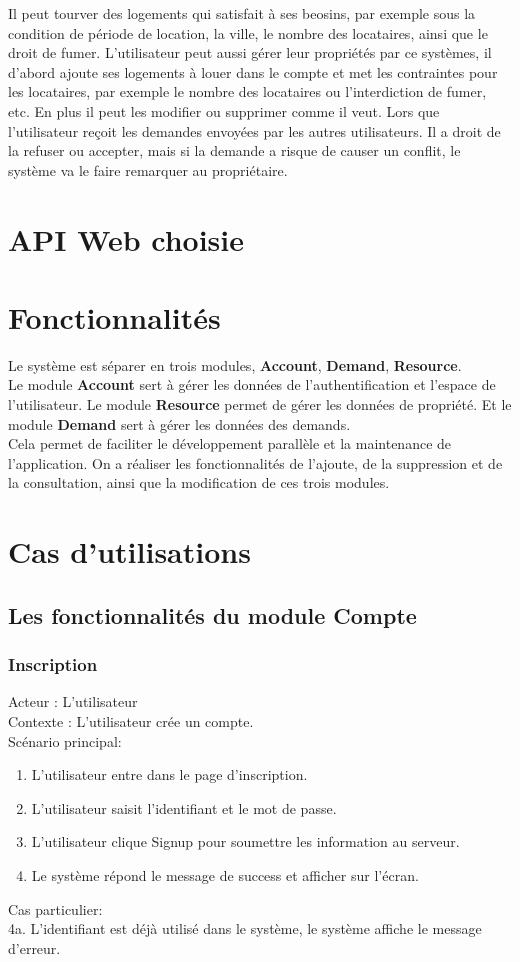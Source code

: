 \documentclass[14px]{article}
\begin{document}
Il peut tourver des logements qui satisfait à ses beosins, par exemple sous la condition de période de location, la ville, le nombre des locataires, ainsi que le droit de fumer.
L'utilisateur peut aussi gérer leur propriétés par ce systèmes, il d'abord ajoute ses logements à louer dans le compte et met les contraintes pour les locataires, par exemple le nombre des locataires ou l'interdiction de fumer, etc.  En plus il peut les modifier ou supprimer comme il veut. Lors que l'utilisateur reçoit les demandes envoyées par les autres utilisateurs. Il a droit de la refuser ou accepter, mais si la demande a risque de causer un conflit, le système va le faire remarquer au propriétaire.
 
\section{API Web choisie}

\section{Fonctionnalités}
Le système est séparer en trois modules, \textbf{Account}, \textbf{Demand}, \textbf{Resource}. \\
Le module \textbf{Account} sert à gérer les données de l'authentification et l'espace de l'utilisateur. Le module \textbf{Resource} permet de gérer les données de propriété. Et le module \textbf{Demand} sert à gérer les données des demands.\\
Cela permet de faciliter le développement parallèle et la maintenance de l'application. On a réaliser les fonctionnalités de l'ajoute, de la suppression et de la consultation, ainsi que la modification de ces trois modules. 

\section{Cas d'utilisations}
\subsection{Les fonctionnalités du module Compte}
\subsubsection{Inscription}
Acteur : L'utilisateur\\
Contexte : L'utilisateur crée un compte.\\
Scénario principal: 
\begin{enumerate}
	\item L'utilisateur entre dans le page d'inscription.
	\item L'utilisateur saisit l'identifiant et le mot de passe.
	\item L'utilisateur clique Signup pour soumettre les information au serveur.
	\item Le système répond le message de success et afficher sur l'écran.	
\end{enumerate}
Cas particulier:\\
4a. L'identifiant est déjà utilisé dans le système, le système affiche le message d'erreur.
\end{document}
